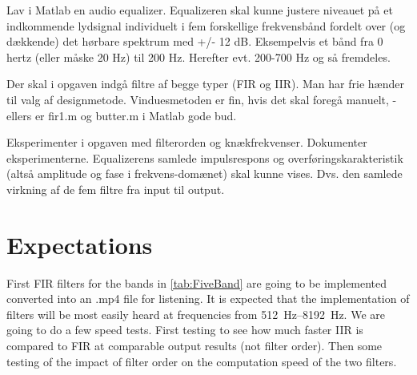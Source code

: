 Lav i Matlab en audio equalizer. Equalizeren skal kunne justere niveauet på et indkommende lydsignal individuelt i fem forskellige frekvensbånd fordelt over (og dækkende) det hørbare spektrum med +/- 12 dB. Eksempelvis et bånd fra 0 hertz (eller måske 20 Hz) til 200 Hz. Herefter evt. 200-700 Hz og så fremdeles.

Der skal i opgaven indgå filtre af begge typer (FIR og IIR). Man har frie hænder til valg af designmetode. Vinduesmetoden er fin, hvis det skal foregå manuelt, - ellers er fir1.m og butter.m i Matlab gode bud.

Eksperimenter i opgaven med filterorden og knækfrekvenser. Dokumenter eksperimenterne. Equalizerens samlede impulsrespons og overføringskarakteristik (altså amplitude og fase i frekvens-domænet) skal kunne vises. Dvs. den samlede virkning af de fem filtre fra input til output.

\section{Expectations}
\label{sec:expectations}

First FIR filters for the bands in \cref{tab:FiveBand} are going to be implemented converted into an .mp4 file for listening. It is expected that the implementation of filters will be most easily heard at frequencies from \SIrange{512}{8192}{\hertz}.
We are going to do a few speed tests. First testing to see how much faster IIR is compared to FIR at comparable output results (not filter order). Then some testing of the impact of filter order on the computation speed of the two filters.
